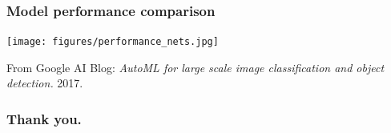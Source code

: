 \documentclass[10pt,hyperref={pdfpagelabels=false}]{beamer}
\begin{document}
\begin{frame}
    \frametitle{Model performance comparison}
    \centering\texttt{[image: figures/performance\_nets.jpg]}

    {\small From Google AI Blog: \emph{AutoML for large scale image classification and object detection.} 2017.}
\end{frame}
\begin{frame}
    \frametitle{Thank you.}
\end{frame}
\end{document}
